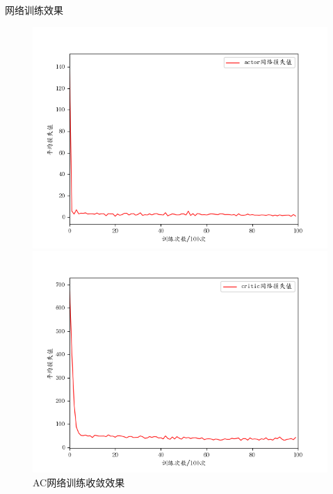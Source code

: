 \documentclass{beamer}
\begin{document}
\begin{frame}{网络训练效果}
    \begin{figure}[htbp]
        \begin{minipage}{0.49\linewidth}
            \centering
            \includegraphics[scale=0.4]{pic/actor_x.png}
        \end{minipage}
        \begin{minipage}{0.49\linewidth}
            \centering
            \includegraphics[scale=0.4]{pic/critic_x.png}
        \end{minipage}
        \caption{AC网络训练收敛效果}
    \end{figure}
\end{frame}
\end{document}
